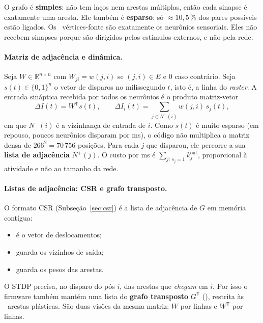 \documentclass[11pt,a4paper]{article}
\DeclareRobustCommand{\cod}[1]{\texttt{\detokenize{#1}}}
\begin{document}
O grafo é \textbf{simples}: não tem laços nem arestas múltiplas, então cada sinapse é exatamente uma aresta. Ele também é
\textbf{esparso}: só $\approx 10{,}5\,\%$ dos pares possíveis estão ligados. Os \gKinZero\ vértices-fonte são exatamente os
neurônios sensoriais. Eles não recebem sinapses porque são dirigidos pelos estímulos externos, e não pela rede.

\paragraph{Matriz de adjacência e dinâmica.} Seja $W\in\mathbb{R}^{n\times n}$ com $W_{ji}=w(j,i)$ se $(j,i)\in E$ e $0$ caso
contrário. Seja $s(t)\in\{0,1\}^n$ o vetor de disparos no milissegundo $t$, isto é, a linha do \emph{raster}. A entrada sináptica
recebida por todos os neurônios é o produto matriz-vetor
\begin{equation}
\Delta I(t) = W^{\mathsf T} s(t), \qquad \Delta I_i(t)=\sum_{j\in N^{-}(i)} w(j,i)\,s_j(t),
\end{equation}
em que $N^{-}(i)$ é a vizinhança de entrada de $i$. Como $s(t)$ é muito esparso (em repouso, poucos neurônios disparam por ms), o
código não multiplica a matriz densa de $266^2=70\,756$ posições. Para cada $j$ que disparou, ele percorre a sua \textbf{lista de
adjacência} $N^{+}(j)$. O custo por ms é $\sum_{j:\,s_j=1} k^\text{out}_j$, proporcional à atividade e não ao tamanho da rede.

\paragraph{Listas de adjacência: CSR e grafo transposto.} O formato CSR (Subseção~\ref{sec:csr}) é a lista de adjacência de $G$ em
memória contígua:
\begin{itemize}
  \item \cod{s_off} é o vetor de deslocamentos;
  \item \cod{s_pos} guarda os vizinhos de saída;
  \item \cod{s_w} guarda os pesos das arestas.
\end{itemize}
O STDP precisa, no disparo do pós $i$, das arestas que \emph{chegam} em $i$. Por isso o firmware também mantém uma lista do
\textbf{grafo transposto} $G^{\mathsf T}$ (\cod{s_rin_off}), restrita às \vNPl\ arestas plásticas. São duas visões da mesma matriz:
$W$ por linhas e $W^{\mathsf T}$ por linhas.
\end{document}
